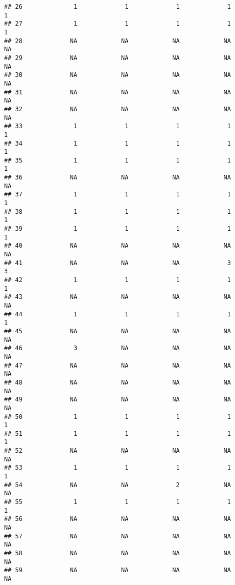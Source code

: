 \documentclass[
]{article}
\begin{document}
\begin{verbatim}
## 26              1             1             1             1             1
## 27              1             1             1             1             1
## 28             NA            NA            NA            NA            NA
## 29             NA            NA            NA            NA            NA
## 30             NA            NA            NA            NA            NA
## 31             NA            NA            NA            NA            NA
## 32             NA            NA            NA            NA            NA
## 33              1             1             1             1             1
## 34              1             1             1             1             1
## 35              1             1             1             1             1
## 36             NA            NA            NA            NA            NA
## 37              1             1             1             1             1
## 38              1             1             1             1             1
## 39              1             1             1             1             1
## 40             NA            NA            NA            NA            NA
## 41             NA            NA            NA             3             3
## 42              1             1             1             1             1
## 43             NA            NA            NA            NA            NA
## 44              1             1             1             1             1
## 45             NA            NA            NA            NA            NA
## 46              3            NA            NA            NA            NA
## 47             NA            NA            NA            NA            NA
## 48             NA            NA            NA            NA            NA
## 49             NA            NA            NA            NA            NA
## 50              1             1             1             1             1
## 51              1             1             1             1             1
## 52             NA            NA            NA            NA            NA
## 53              1             1             1             1             1
## 54             NA            NA             2            NA            NA
## 55              1             1             1             1             1
## 56             NA            NA            NA            NA            NA
## 57             NA            NA            NA            NA            NA
## 58             NA            NA            NA            NA            NA
## 59             NA            NA            NA            NA            NA

\end{verbatim}
\end{document}
